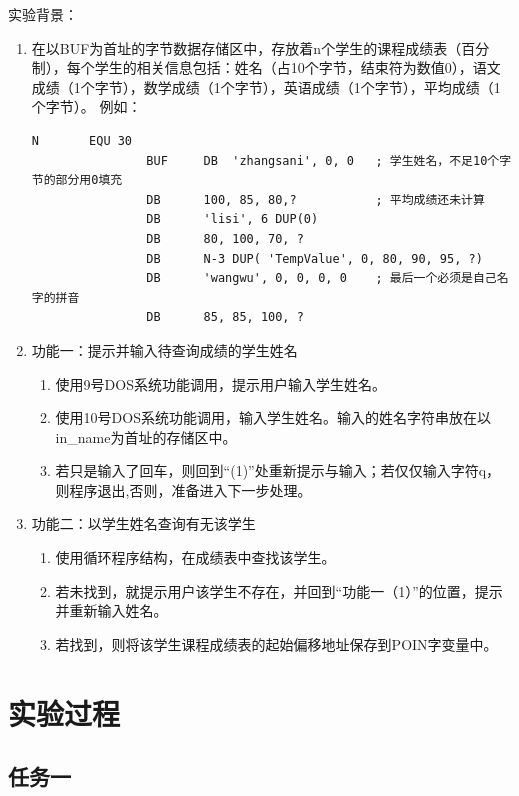 \documentclass{article}
\newenvironment{codeFont}{\codeF}{\par}
\begin{document}
	实验背景：
	\begin{enumerate}
		\item 在以BUF为首址的字节数据存储区中，存放着n个学生的课程成绩表（百分制），每个学生的相关信息包括：姓名（占10个字节，结束符为数值0），语文成绩（1个字节），数学成绩（1个字节），英语成绩（1个字节），平均成绩（1个字节）。
			例如：
			\begin{codeFont}
			\begin{lstlisting}[gobble=16]
				N		EQU	30
				BUF		DB	'zhangsani', 0, 0	; 学生姓名，不足10个字节的部分用0填充
				DB		100, 85, 80,?			; 平均成绩还未计算
				DB		'lisi', 6 DUP(0)
				DB		80, 100, 70, ?
				DB		N-3 DUP( 'TempValue', 0, 80, 90, 95, ?)
				DB		'wangwu', 0, 0, 0, 0	; 最后一个必须是自己名字的拼音
				DB		85, 85, 100, ?
			\end{lstlisting}
			\end{codeFont}

		\item 功能一：提示并输入待查询成绩的学生姓名
			\begin{enumerate}
				\item 使用9号DOS系统功能调用，提示用户输入学生姓名。
				\item 使用10号DOS系统功能调用，输入学生姓名。输入的姓名字符串放在以in\_name为首址的存储区中。
				\item 若只是输入了回车，则回到“(1)”处重新提示与输入；若仅仅输入字符q，则程序退出,否则，准备进入下一步处理。
			\end{enumerate}

		\item 功能二：以学生姓名查询有无该学生
			\begin{enumerate}
				\item 使用循环程序结构，在成绩表中查找该学生。
				\item 若未找到，就提示用户该学生不存在，并回到“功能一（1）”的位置，提示并重新输入姓名。
				\item 若找到，则将该学生课程成绩表的起始偏移地址保存到POIN字变量中。
			\end{enumerate}

	\end{enumerate}

	\section{实验过程}

	\subsection{任务一}
\end{document}
